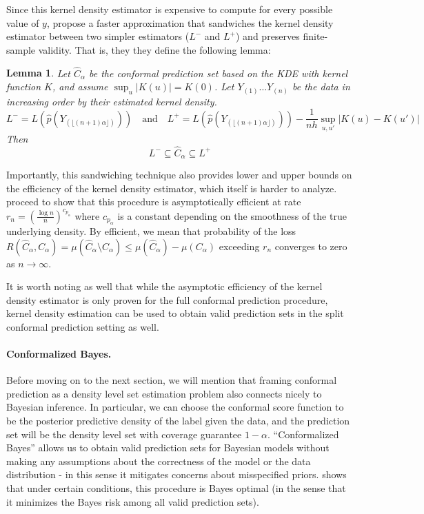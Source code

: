 \documentclass[a4paper, 12pt]{article}
\newtheorem{lemma}{Lemma}
\begin{document}
Since this kernel density estimator is expensive to compute for every possible value of $y$, \citeauthor{leiDistributionFreePrediction2013} propose a faster approximation that sandwiches the kernel density estimator between two simpler estimators ($L^-$ and $L^+$) and preserves finite-sample validity. That is, they they define the following lemma:
\begin{lemma}
    Let $\hat{C}_\alpha$ be the conformal prediction set based on the KDE with kernel function $K$, and assume $\sup_u |K(u)|=K(0)$. Let $Y_{(1)} \ldots Y_{(n)}$ be the data in increasing order by their estimated kernel density.
    \[L^-= L\left(\hat{p}(Y_{(\lfloor (n+1)\alpha \rfloor)})\right) \quad \text{and} \quad
        L^+= L\left(\hat{p}(Y_{(\lfloor (n+1)\alpha \rfloor)})\right) - \frac{1}{nh} \sup_{u, u'} |K(u) - K(u')| \]
    Then
    \[ L^- \subseteq \hat{C}_\alpha \subseteq L^+ \]
\end{lemma}

Importantly, this sandwiching technique also provides lower and upper bounds on the efficiency of the kernel density estimator, which itself is harder to analyze. \textcite{leiDistributionFreePrediction2013} proceed to show that this procedure is asymptotically efficient at rate $r_n=(\frac{\log n}{n})^{c_{p_\alpha}}$ where $c_{p_\alpha}$ is a constant depending on the smoothness of the true underlying density. By efficient, we mean that probability of the loss $R(\hat{C}_\alpha, C_\alpha) = \mu(\hat{C}_\alpha \setminus C_\alpha) \leq \mu(\hat{C}_\alpha) - \mu(C_\alpha)$ exceeding $r_n$ converges to zero as $n \to \infty$.

It is worth noting as well that while the asymptotic efficiency of the kernel density estimator is only proven for the full conformal prediction procedure, kernel density estimation can be used to obtain valid prediction sets in the split conformal prediction setting as well.

\paragraph*{Conformalized Bayes.} Before moving on to the next section, we will mention that framing conformal prediction as a density level set estimation problem also connects nicely to Bayesian inference. In particular, we can choose the conformal score function to be the posterior predictive density of the label given the data, and the prediction set will be the density level set with coverage guarantee $1-\alpha$. ``Conformalized Bayes'' allows us to obtain valid prediction sets for Bayesian models without making any assumptions about the correctness of the model or the data distribution - in this sense it mitigates concerns about misspecified priors. \textcite{hoffBayesoptimalPredictionFrequentist2021} shows that under certain conditions, this procedure is Bayes optimal (in the sense that it minimizes the Bayes risk among all valid prediction sets).
\end{document}
